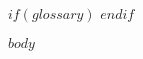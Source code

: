 \documentclass{scrbook} %
\begin{document}
	
	
	\ifisbook\cleardoubleemptypage\fi

	\tableofcontents
    \listoffigures

    $if(glossary)$
    \printnoidxglossary
    $endif$
    
	\cleardoublepage

    $body$


	\ifisbook\pagestyle{plain}\cleardoubleemptypage\fi
\end{document}

